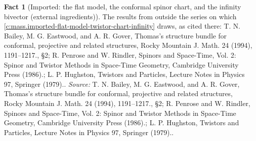 \documentclass[11pt]{article}
\theoremstyle{definition}
\newtheorem{fact}[theorem]{Fact}
\theoremstyle{plain}
\begin{document}
\begin{fact}[Imported: the flat model, the conformal spinor chart, and the infinity bivector (external ingredients)]\label{c:mass.imported-flat-model-twistor-chart-infinity-external}
The results from outside the series on which \ref{c:mass.imported-flat-model-twistor-chart-infinity} draws, as cited there: T. N. Bailey, M. G. Eastwood, and A. R. Gover, Thomas's structure bundle for conformal, projective and related structures, Rocky Mountain J. Math. 24 (1994), 1191--1217., \S2; R. Penrose and W. Rindler, Spinors and Space-Time, Vol. 2: Spinor and Twistor Methods in Space-Time Geometry, Cambridge University Press (1986).; L. P. Hughston, Twistors and Particles, Lecture Notes in Physics 97, Springer (1979)..
\emph{Source:} T. N. Bailey, M. G. Eastwood, and A. R. Gover, Thomas's structure bundle for conformal, projective and related structures, Rocky Mountain J. Math. 24 (1994), 1191--1217., \S2; R. Penrose and W. Rindler, Spinors and Space-Time, Vol. 2: Spinor and Twistor Methods in Space-Time Geometry, Cambridge University Press (1986).; L. P. Hughston, Twistors and Particles, Lecture Notes in Physics 97, Springer (1979)..
\end{fact}
\end{document}
